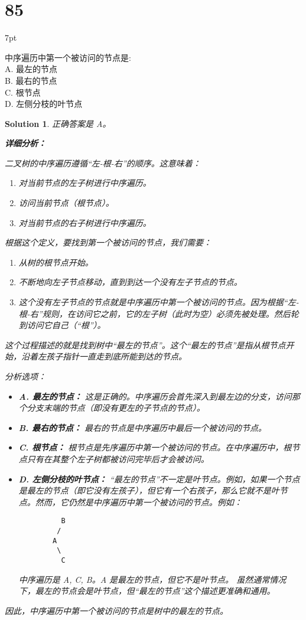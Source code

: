\documentclass[UTF8]{report}
\newtheorem{solution}{Solution}
\theoremstyle{MyLineTheoremStyle} %
\theoremstyle{MyBlockTheoremStyle} %
\theoremstyle{MySubsubsectionStyle} %
\newenvironment{graybox}{%
        \def\FrameCommand{%
        \hspace{1pt}%
        {\color{gray}\small \vrule width 2pt}%
        {\color{graybox_color}\vrule width 4pt}%
        \colorbox{graybox_color}%
        }%
        \MakeFramed{\advance\hsize-\width\FrameRestore}%
        \noindent\hspace{-4.55pt}%
        \begin{adjustwidth}{}{7pt}%
        \vspace{2pt}\vspace{2pt}%
        }
        {%
        \vspace{2pt}\end{adjustwidth}\endMakeFramed%
        }
\begin{document}
\section*{85}
\begin{graybox}
中序遍历中第一个被访问的节点是: \\
A. 最左的节点 \\
B. 最右的节点 \\
C. 根节点 \\
D. 左侧分枝的叶节点
\end{graybox}

\begin{solution}
正确答案是 A。

\textbf{详细分析：}

二叉树的中序遍历遵循“左-根-右”的顺序。这意味着：
\begin{enumerate}
    \item 对当前节点的左子树进行中序遍历。
    \item 访问当前节点（根节点）。
    \item 对当前节点的右子树进行中序遍历。
\end{enumerate}

根据这个定义，要找到第一个被访问的节点，我们需要：
\begin{enumerate}
    \item 从树的根节点开始。
    \item 不断地向左子节点移动，直到到达一个没有左子节点的节点。
    \item 这个没有左子节点的节点就是中序遍历中第一个被访问的节点。因为根据“左-根-右”规则，在访问它之前，它的左子树（此时为空）必须先被处理。然后轮到访问它自己（“根”）。
\end{enumerate}

这个过程描述的就是找到树中“最左的节点”。这个“最左的节点”是指从根节点开始，沿着左孩子指针一直走到底所能到达的节点。

分析选项：
\begin{itemize}
    \item \textbf{A. 最左的节点：} 这是正确的。中序遍历会首先深入到最左边的分支，访问那个分支末端的节点（即没有更左的子节点的节点）。
    \item \textbf{B. 最右的节点：} 最右的节点是中序遍历中最后一个被访问的节点。
    \item \textbf{C. 根节点：} 根节点是先序遍历中第一个被访问的节点。在中序遍历中，根节点只有在其整个左子树都被访问完毕后才会被访问。
    \item \textbf{D. 左侧分枝的叶节点：} “最左的节点”不一定是叶节点。例如，如果一个节点是最左的节点（即它没有左孩子），但它有一个右孩子，那么它就不是叶节点。然而，它仍然是中序遍历中第一个被访问的节点。例如：
    \begin{verbatim}
          B
         /
        A
         \
          C
    \end{verbatim}
    中序遍历是 A, C, B。A 是最左的节点，但它不是叶节点。
    虽然通常情况下，最左的节点会是叶节点，但“最左的节点”这个描述更准确和通用。
\end{itemize}

因此，中序遍历中第一个被访问的节点是树中的最左的节点。
\end{solution}
\end{document}
